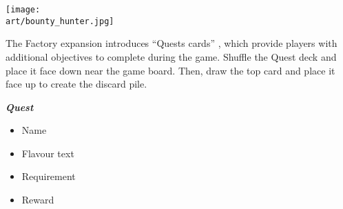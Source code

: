 
\begin{multicols*}{2}

\begin{center}
  \texttt{[image: \\art/bounty\_hunter.jpg]}
\end{center}
\columnbreak



The Factory expansion introduces “Quests cards” , which provide players with additional objectives to complete during the game.
Shuffle the Quest deck and place it face down near the game board.
Then, draw the top card and place it face up to create the discard pile.

{
  \bigskip
  \centering
  \begin{scriptsize}
  \end{scriptsize}

  \footnotesize
  \textbf{\textit{\textcolor{darkcandyapplered}{Quest}}}

  \begin{multicols}{2}
    \begin{itemize}[itemsep=0pt, parsep=5pt, topsep=0pt, partopsep=0pt]
      \item[\textbf{1.}] Name
      \item[\textbf{2.}] Flavour text
      \item[\textbf{3.}] Requirement
      \item[\textbf{4.}] Reward
    \end{itemize}
  \end{multicols}
}


\end{multicols*}
